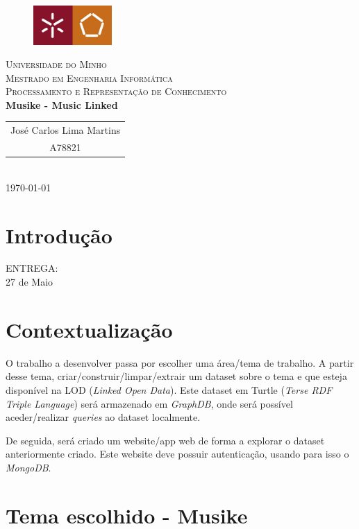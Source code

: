 \documentclass{article}
\begin{document}
{
\center
\begin{figure}[H]
        \centering
        \includegraphics[width=3cm]{Pictures/UM_EENG.jpg}
\end{figure}
\textsc{\Large Universidade do Minho} \\ [0.5cm]
\textsc{\Large Mestrado em Engenharia Informática} \\ [0.5cm]
\textsc{\large Processamento e Representação de Conhecimento} \\ [0.5cm]

{\LARGE \bfseries Musike - Music Linked} \\[0.5cm]

\begin{tabular}{c} 
    José Carlos Lima Martins \\
    A78821 \\
\end{tabular} \\[0.5cm]

\today \\[1cm]
}

\section{Introdução}

ENTREGA:\\
27 de Maio\\

\section{Contextualização}

O trabalho a desenvolver passa por escolher uma área/tema de trabalho. A partir desse tema, criar/construir/limpar/extrair um dataset sobre o tema e que esteja disponível na LOD (\textit{Linked Open Data}). Este dataset em Turtle (\textit{Terse RDF Triple Language}) será armazenado em \textit{GraphDB}, onde será possível aceder/realizar \textit{queries} ao dataset localmente.

De seguida, será criado um website/app web de forma a explorar o dataset anteriormente criado. Este website deve possuir autenticação, usando para isso o \textit{MongoDB}.

\section{Tema escolhido - \textbf{Musike}} \label{tema}
\end{document}

